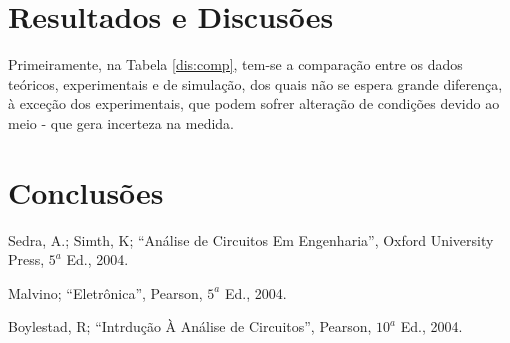 \documentclass[a4paper,12pt,oneside,openany,table,xcdraw]{article}
\begin{document}

\section{Resultados e Discusões} %
Primeiramente, na Tabela \ref{dis:comp}, tem-se a comparação entre os dados teóricos, experimentais e de simulação, dos quais não se espera grande diferença, à exceção dos experimentais, que podem sofrer alteração de condições devido ao meio - que gera incerteza na medida.


\section{Conclusões} %

\newpage
\begin{thebibliography}{9} 
    Sedra, A.; Simth, K; 
    “Análise de Circuitos Em Engenharia”, Oxford University Press, $5^a$ Ed., 2004.

    Malvino; 
    “Eletrônica”, Pearson, $5^a$ Ed., 2004.

    Boylestad, R;
    “Intrdução À Análise de Circuitos”, Pearson, $10^a$ Ed., 2004.

\end{thebibliography}
\end{document}
